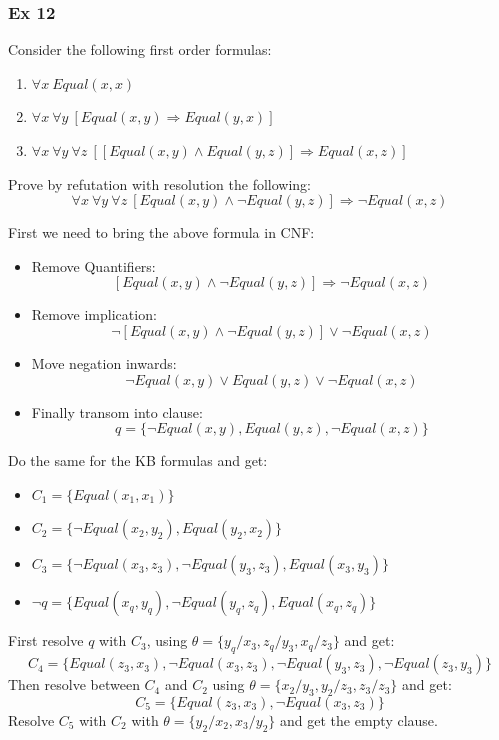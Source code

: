 \documentclass[10pt,a4paper]{article}
\begin{document}
\subsubsection{Ex 12}
Consider the following first order formulas:
\begin{enumerate}
\item $\forall x\ Equal(x,x)$
\item $\forall x\ \forall y\ [Equal(x,y) \Rightarrow Equal(y,x)]$
\item $\forall x\ \forall y\ \forall z\ [[Equal(x,y)\wedge Equal(y,z)]\Rightarrow Equal(x,z)]$
\end{enumerate}

Prove by refutation with resolution the following: 
\[\forall x\ \forall y\ \forall z\ [Equal(x, y) \wedge \neg Equal(y, z)]\Rightarrow \neg Equal(x, z)\]

First we need to bring the above formula in CNF:
\begin{itemize}
\item Remove Quantifiers:
\[[Equal(x, y) \wedge \neg Equal(y, z)]\Rightarrow \neg Equal(x, z)\]
\item Remove implication:
\[\neg [Equal(x, y) \wedge \neg Equal(y, z)]\vee \neg Equal(x, z)\]
\item Move negation inwards:
\[\neg Equal(x, y) \vee Equal(y, z) \vee \neg Equal(x, z)\]
\item Finally transom into clause:
\[q=\lbrace \neg Equal(x, y), Equal(y, z), \neg Equal(x, z) \rbrace\]

\end{itemize}
Do the same for the KB formulas and get:
\begin{itemize}
\item $C_1=\lbrace Equal(x_1,x_1) \rbrace$
\item $C_2=\lbrace \neg Equal(x_2,y_2), Equal(y_2,x_2)\rbrace$
\item $C_3=\lbrace \neg Equal(x_3,z_3), \neg Equal(y_3,z_3),  Equal(x_3,y_3) \rbrace$
\item $\neg q= \lbrace Equal(x_q, y_q),\neg Equal(y_q, z_q), Equal(x_q, z_q) \rbrace$
\end{itemize}

First resolve $q$ with $C_3$, using $\theta=\lbrace y_q/x_3, z_q/y_3, x_q/z_3 \rbrace$ and get:
\[C_4=\lbrace Equal(z_3,x_3),\neg Equal(x_3,z_3),\neg Equal(y_3,z_3),\neg Equal(z_3,y_3) \rbrace\]
Then resolve between $C_4$ and $C_2$  using $\theta=\lbrace x_2/y_3, y_2/z_3, z_3/z_3 \rbrace$ and get:
\[C_5= \lbrace Equal(z_3,x_3),\neg Equal(x_3,z_3) \rbrace\]
Resolve $C_5$ with $C_2$ with $\theta=\lbrace y_2/x_2, x_3/y_2 \rbrace$ and get the empty clause.
\end{document}
